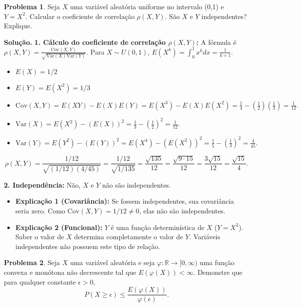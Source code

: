 \documentclass{article}
\theoremstyle{definition}
\newtheorem{problema}{Problema}
\newenvironment{solucao}{\par\noindent\textbf{Solução.}}{\par}
\begin{document}
	\hrulefill
	
	\begin{problema}{}
		Seja $X$ uma variável aleatória uniforme no intervalo (0,1) e $Y=X^2.$ Calcular o coeficiente de correlação $\rho(X, Y).$ São $X$ e $Y$ independentes? Explique.
	\end{problema}
	
	\begin{solucao}
		\textbf{1. Cálculo do coeficiente de correlação $\rho(X, Y)$:}
		A fórmula é $\rho(X,Y) = \frac{\text{Cov}(X,Y)}{\sqrt{\text{Var}(X)\text{Var}(Y)}}$. Para $X \sim U(0,1)$, $E(X^k) = \int_0^1 x^k dx = \frac{1}{k+1}$.
		
		\begin{itemize}
			\item $E(X) = 1/2$
			\item $E(Y) = E(X^2) = 1/3$
			\item $\text{Cov}(X,Y) = E(XY) - E(X)E(Y) = E(X^3) - E(X)E(X^2) = \frac{1}{4} - (\frac{1}{2})(\frac{1}{3}) = \frac{1}{12}.$
			\item $\text{Var}(X) = E(X^2) - (E(X))^2 = \frac{1}{3} - (\frac{1}{2})^2 = \frac{1}{12}.$
			\item $\text{Var}(Y) = E(Y^2) - (E(Y))^2 = E(X^4) - (E(X^2))^2 = \frac{1}{5} - (\frac{1}{3})^2 = \frac{4}{45}.$
		\end{itemize}
		\[ \rho(X,Y) = \frac{1/12}{\sqrt{(1/12)(4/45)}} = \frac{1/12}{\sqrt{1/135}} = \frac{\sqrt{135}}{12} = \frac{\sqrt{9 \cdot 15}}{12} = \frac{3\sqrt{15}}{12} = \frac{\sqrt{15}}{4}. \]
		
		\textbf{2. Independência:}
		Não, $X$ e $Y$ não são independentes. 
		\begin{itemize}
			\item \textbf{Explicação 1 (Covariância):} Se fossem independentes, sua covariância seria zero. Como $\text{Cov}(X,Y) = 1/12 \neq 0$, elas não são independentes.
			\item \textbf{Explicação 2 (Funcional):} $Y$ é uma função determinística de $X$ ($Y=X^2$). Saber o valor de $X$ determina completamente o valor de $Y$. Variáveis independentes não possuem este tipo de relação.
		\end{itemize}
	\end{solucao}
	
	\hrulefill
	
	\begin{problema}{}
		Seja $X$ uma variável aleatória e seja $\varphi : \mathbb{R} \to [0, \infty)$ uma função convexa e monótona não decrescente tal que $E(\varphi(X)) < \infty$. Demonstre que para qualquer constante $\epsilon > 0$,
		\[
		P(X \ge \epsilon) \le \frac{E(\varphi(X))}{\varphi(\epsilon)}.
		\]
	\end{problema}
	
\end{document}
